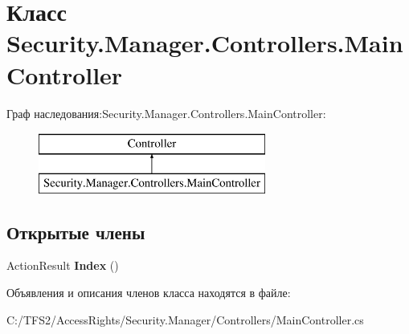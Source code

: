 \hypertarget{class_security_1_1_manager_1_1_controllers_1_1_main_controller}{}\section{Класс Security.\+Manager.\+Controllers.\+Main\+Controller}
\label{class_security_1_1_manager_1_1_controllers_1_1_main_controller}
Граф наследования\+:Security.\+Manager.\+Controllers.\+Main\+Controller\+:\begin{figure}[H]
\begin{center}
\leavevmode
\includegraphics[height=2.000000cm]{d2/ddc/class_security_1_1_manager_1_1_controllers_1_1_main_controller}
\end{center}
\end{figure}
\subsection*{Открытые члены}
\begin{DoxyCompactItemize}
\item 
\mbox{\label{class_security_1_1_manager_1_1_controllers_1_1_main_controller_a67812f52d4b07b8b907c0a03b56974a6}} 
Action\+Result {\bfseries Index} ()
\end{DoxyCompactItemize}


Объявления и описания членов класса находятся в файле\+:\begin{DoxyCompactItemize}
\item 
C\+:/\+T\+F\+S2/\+Access\+Rights/\+Security.\+Manager/\+Controllers/Main\+Controller.\+cs\end{DoxyCompactItemize}
